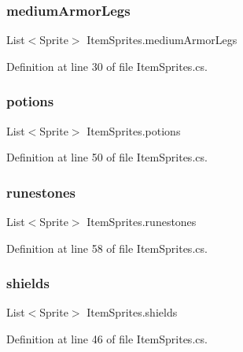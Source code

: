 \subsubsection{\texorpdfstring{mediumArmorLegs}{mediumArmorLegs}}
{\footnotesize\ttfamily List$<$Sprite$>$ Item\+Sprites.\+medium\+Armor\+Legs}



Definition at line 30 of file Item\+Sprites.\+cs.

\mbox{\label{class_item_sprites_a7edcb72c95de6c7b10aead3a6e59ccb9}} 
\subsubsection{\texorpdfstring{potions}{potions}}
{\footnotesize\ttfamily List$<$Sprite$>$ Item\+Sprites.\+potions}



Definition at line 50 of file Item\+Sprites.\+cs.

\mbox{\label{class_item_sprites_ac41017b0ab64887f9dedbc827e78ce57}} 
\subsubsection{\texorpdfstring{runestones}{runestones}}
{\footnotesize\ttfamily List$<$Sprite$>$ Item\+Sprites.\+runestones}



Definition at line 58 of file Item\+Sprites.\+cs.

\mbox{\label{class_item_sprites_adbedbbca6d16894379af1b4dc63ab15a}} 
\subsubsection{\texorpdfstring{shields}{shields}}
{\footnotesize\ttfamily List$<$Sprite$>$ Item\+Sprites.\+shields}



Definition at line 46 of file Item\+Sprites.\+cs.

\mbox{\label{class_item_sprites_aff0db6a06ded4b250ae835075f5ae8f9}} 
